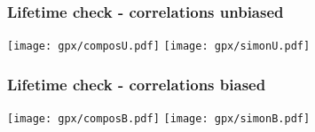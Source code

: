 \documentclass[aspectratio=43,9pt]{beamer}
\begin{document}
\begin{frame}[default] %
\frametitle{Lifetime check - correlations unbiased}

\begin{center}
  \texttt{[image: gpx/composU.pdf]}
  \texttt{[image: gpx/simonU.pdf]}
\end{center}

\end{frame} %


\begin{frame}[default] %
\frametitle{Lifetime check - correlations biased}


\begin{center}
  \texttt{[image: gpx/composB.pdf]}
  \texttt{[image: gpx/simonB.pdf]}
\end{center}

\end{frame} %

\end{document}
